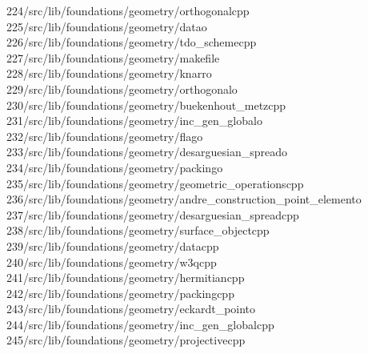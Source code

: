 \begin{tabbing}
224\>/src/lib/foundations/geometry/orthogonalcpp\\[0pt]
225\>/src/lib/foundations/geometry/datao\\[0pt]
226\>/src/lib/foundations/geometry/tdo\_schemecpp\\[0pt]
227\>/src/lib/foundations/geometry/makefile\\[0pt]
228\>/src/lib/foundations/geometry/knarro\\[0pt]
229\>/src/lib/foundations/geometry/orthogonalo\\[0pt]
230\>/src/lib/foundations/geometry/buekenhout\_metzcpp\\[0pt]
231\>/src/lib/foundations/geometry/inc\_gen\_globalo\\[0pt]
232\>/src/lib/foundations/geometry/flago\\[0pt]
233\>/src/lib/foundations/geometry/desarguesian\_spreado\\[0pt]
234\>/src/lib/foundations/geometry/packingo\\[0pt]
235\>/src/lib/foundations/geometry/geometric\_operationscpp\\[0pt]
236\>/src/lib/foundations/geometry/andre\_construction\_point\_elemento\\[0pt]
237\>/src/lib/foundations/geometry/desarguesian\_spreadcpp\\[0pt]
238\>/src/lib/foundations/geometry/surface\_objectcpp\\[0pt]
239\>/src/lib/foundations/geometry/datacpp\\[0pt]
240\>/src/lib/foundations/geometry/w3qcpp\\[0pt]
241\>/src/lib/foundations/geometry/hermitiancpp\\[0pt]
242\>/src/lib/foundations/geometry/packingcpp\\[0pt]
243\>/src/lib/foundations/geometry/eckardt\_pointo\\[0pt]
244\>/src/lib/foundations/geometry/inc\_gen\_globalcpp\\[0pt]
245\>/src/lib/foundations/geometry/projectivecpp\\[0pt]

\end{tabbing}
